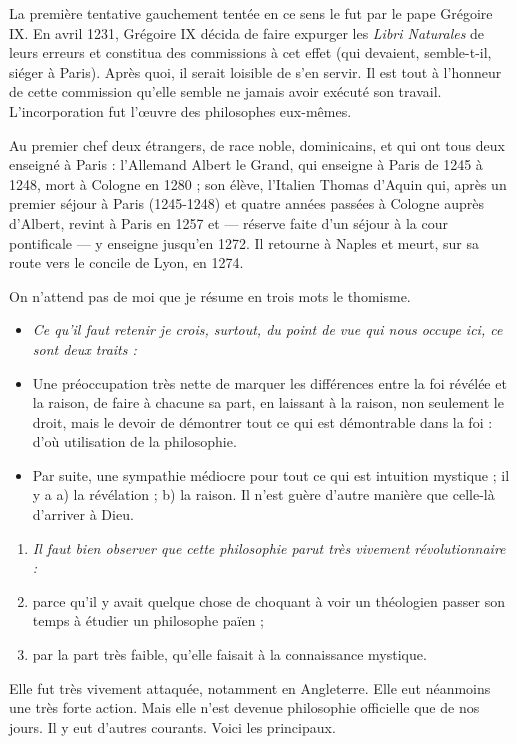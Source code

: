 \documentclass[french,twoside]{book} %
\newlength{\listmod}
\newcommand{\listhead}[1]{\hspace{-1\listmod}\emph{#1}}
\begin{document}
La première tentative gauchement tentée en ce sens le fut par le pape Grégoire IX. En avril 1231, Grégoire IX décida de faire expurger les {\itshape Libri Naturales} de leurs erreurs et constitua des commissions à cet effet (qui devaient, semble-t-il, siéger à Paris). Après quoi, il serait loisible de s’en servir. Il est tout à l’honneur de cette commission qu’elle semble ne jamais avoir exécuté son travail. L’incorporation fut l’œuvre des philosophes eux-mêmes.\par
Au premier chef deux étrangers, de race noble, dominicains, et qui ont tous deux enseigné à Paris : l’Allemand Albert le Grand, qui enseigne à Paris de 1245 à 1248, mort à Cologne en 1280 ; son élève, l’Italien Thomas d’Aquin qui, après un premier séjour à Paris (1245-1248) et quatre années passées à Cologne auprès d’Albert, revint à Paris en 1257 et — réserve faite d’un séjour à la cour pontificale — y enseigne jusqu’en 1272. Il retourne à Naples et meurt, sur sa route vers le concile de Lyon, en 1274.\par
On n’attend pas de moi que je résume en trois mots le thomisme.\par

\begin{itemize}[itemsep=0pt,]
\item[]\listhead{Ce qu’il faut retenir je crois, surtout, du point de vue qui nous occupe ici, ce sont deux traits :}
\item Une préoccupation très nette de marquer les différences entre la foi révélée et la raison, de faire à chacune sa part, en laissant à la raison, non seulement le droit, mais le devoir de démontrer tout ce qui est démontrable dans la foi : d’où utilisation de la philosophie.
\item Par suite, une sympathie médiocre pour tout ce qui est intuition mystique ; il y a a) la révélation ; b) la raison. Il n’est guère d’autre manière que celle-là d’arriver à Dieu.
\end{itemize}

\begin{enumerate}[itemsep=0pt,]
\item[]\listhead{Il faut bien observer que cette philosophie parut très vivement révolutionnaire :}
\item parce qu’il y avait quelque chose de choquant à voir un théologien passer son temps à étudier un philosophe païen ;
\label{p121}\item par la part très faible, qu’elle faisait à la connaissance mystique.

\end{enumerate}\noindent Elle fut très vivement attaquée, notamment en Angleterre. Elle eut néanmoins une très forte action. Mais elle n’est devenue philosophie officielle que de nos jours. Il y eut d’autres courants. Voici les principaux.\par
\end{document}

